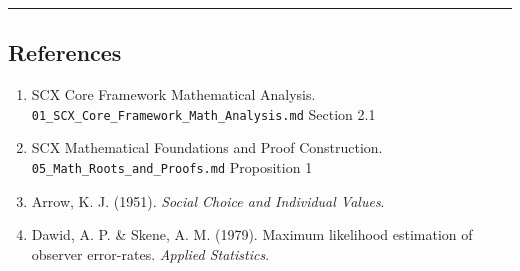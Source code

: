 \documentclass[
  12pt,
]{ctexart}
\providecommand{\tightlist}{%
  \setlength{\itemsep}{0pt}\setlength{\parskip}{0pt}}
\begin{document}
\begin{center}\rule{0.5\linewidth}{0.5pt}\end{center}

\subsection{References}\label{references}

\begin{enumerate}
\def\labelenumi{\arabic{enumi}.}
\tightlist
\item
  SCX Core Framework Mathematical Analysis. \texttt{01\_SCX\_Core\_Framework\_Math\_Analysis.md} Section 2.1
\item
  SCX Mathematical Foundations and Proof Construction. \texttt{05\_Math\_Roots\_and\_Proofs.md} Proposition 1
\item
  Arrow, K. J. (1951). \emph{Social Choice and Individual Values}.
\item
  Dawid, A. P. \& Skene, A. M. (1979). Maximum likelihood estimation of observer error-rates. \emph{Applied Statistics}.
\end{enumerate}
\end{document}
